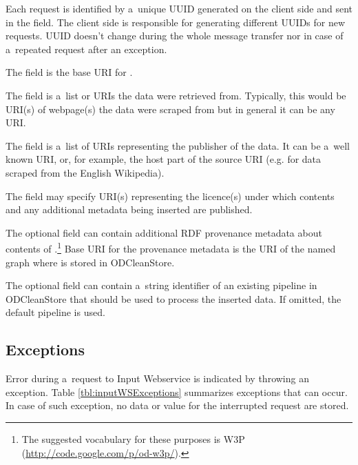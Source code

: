 Each request is identified by a~unique UUID generated on the client side and sent in the  field.
The client side is responsible for generating different UUIDs for new requests.
UUID doesn't change during the whole message transfer nor in case of a~repeated request after an exception.

The  field is the base URI for .

The  field is a~list or URIs the data were retrieved from. Typically, this would be URI(s) of webpage(s) the data were scraped from but in general it can be any URI.

The  field is a~list of URIs representing the publisher of the data. It can be a~well known URI, or, for example, the host part of the source URI (e.g. \linebreak[4] for data scraped from the English Wikipedia).

The  field may specify URI(s) representing the licence(s) under which  contents and any additional  metadata being inserted are published. 

The optional  field can contain additional RDF provenance metadata about contents of .\footnote{The suggested vocabulary for these purposes is W3P (\url{http://code.google.com/p/od-w3p/}).} Base URI for the provenance metadata is the URI of the named graph where  is stored in ODCleanStore.

The optional  field can contain a~string identifier of an existing pipeline in ODCleanStore that should be used to process the inserted data. If omitted, the default pipeline is used. 

\subsection{Exceptions}

Error during a~request to Input Webservice is indicated by throwing an exception. Table \ref{tbl:inputWSExceptions} summarizes exceptions that can occur. In case of such exception, no data or  value for the interrupted request are stored.


